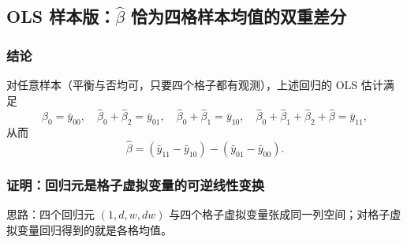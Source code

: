 \subsection{OLS 样本版：\texorpdfstring{$\hat\beta$}{beta hat} 恰为四格样本均值的双重差分}

\subsubsection{结论}

\begin{thm}\label{thm:U15a-ols}
对任意样本（平衡与否均可，只要四个格子都有观测），上述回归的 OLS 估计满足
\[
\hat\beta_0=\bar y_{00},\quad \hat\beta_0+\hat\beta_2=\bar y_{01},\quad \hat\beta_0+\hat\beta_1=\bar y_{10},\quad \hat\beta_0+\hat\beta_1+\hat\beta_2+\hat\beta=\bar y_{11},
\]
从而
\[
\hat\beta=(\bar y_{11}-\bar y_{10})-(\bar y_{01}-\bar y_{00}).
\]
\end{thm}

\subsubsection{证明：回归元是格子虚拟变量的可逆线性变换}

思路：四个回归元 $(1,d,w,dw)$ 与四个格子虚拟变量张成同一列空间；对格子虚拟变量回归得到的就是各格均值。


